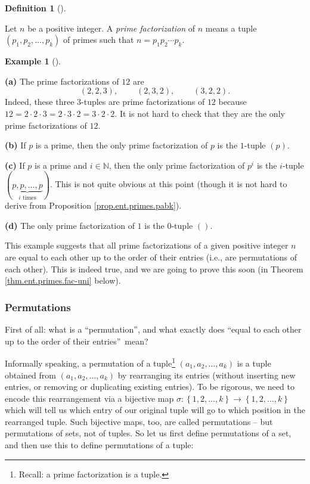 \documentclass[numbers=enddot,12pt,final,onecolumn,notitlepage]{scrartcl}%
\numberwithin{exer}{subsection}
\theoremstyle{definition}
\newtheorem{defi}[theo]{Definition}
\newenvironment{definition}[1][]
{\begin{defi}[#1]\begin{leftbar}}
{\end{leftbar}\end{defi}}
\newtheorem{exam}[theo]{Example}
\newenvironment{example}[1][]
{\begin{exam}[#1]\begin{leftbar}}
{\end{leftbar}\end{exam}}
\begin{document}
\begin{definition}
Let $n$ be a positive integer. A \textit{prime factorization} of $n$ means a
tuple $\left(  p_{1},p_{2},\ldots,p_{k}\right)  $ of primes such that
$n=p_{1}p_{2}\cdots p_{k}$.
\end{definition}

\begin{example}
\textbf{(a)} The prime factorizations of $12$ are%
\[
\left(  2,2,3\right)  ,\ \ \ \ \ \ \ \ \ \ \left(  2,3,2\right)
,\ \ \ \ \ \ \ \ \ \ \left(  3,2,2\right)  .
\]
Indeed, these three $3$-tuples are prime factorizations of $12$ because
$12=2\cdot2\cdot3=2\cdot3\cdot2=3\cdot2\cdot2$. It is not hard to check that
they are the only prime factorizations of $12$.

\textbf{(b)} If $p$ is a prime, then the only prime factorization of $p$ is
the $1$-tuple $\left(  p\right)  $.

\textbf{(c)} If $p$ is a prime and $i\in\mathbb{N}$, then the only prime
factorization of $p^{i}$ is the $i$-tuple $\left(  \underbrace{p,p,\ldots
,p}_{i\text{ times}}\right)  $. This is not quite obvious at this point
(though it is not hard to derive from Proposition \ref{prop.ent.primes.pabk}).

\textbf{(d)} The only prime factorization of $1$ is the $0$-tuple $\left(
{}\right)  $.
\end{example}

This example suggests that all prime factorizations of a given positive
integer $n$ are equal to each other up to the order of their entries (i.e.,
are permutations of each other). This is indeed true, and we are going to
prove this soon (in Theorem \ref{thm.ent.primes.fac-uni} below).

\subsubsection{Permutations}

First of all: what is a \textquotedblleft permutation\textquotedblright, and
what exactly does \textquotedblleft equal to each other up to the order of
their entries\textquotedblright\ mean?

Informally speaking, a permutation of a tuple\footnote{Recall: a prime
factorization is a tuple.} $\left(  a_{1},a_{2},\ldots,a_{k}\right)  $ is a
tuple obtained from $\left(  a_{1},a_{2},\ldots,a_{k}\right)  $ by rearranging
its entries (without inserting new entries, or removing or duplicating
existing entries). To be rigorous, we need to encode this rearrangement via a
bijective map $\sigma:\left\{  1,2,\ldots,k\right\}  \rightarrow\left\{
1,2,\ldots,k\right\}  $ which will tell us which entry of our original tuple
will go to which position in the rearranged tuple. Such bijective maps, too,
are called permutations -- but permutations of sets, not of tuples. So let us
first define permutations of a set, and then use this to define permutations
of a tuple:
\end{document}
